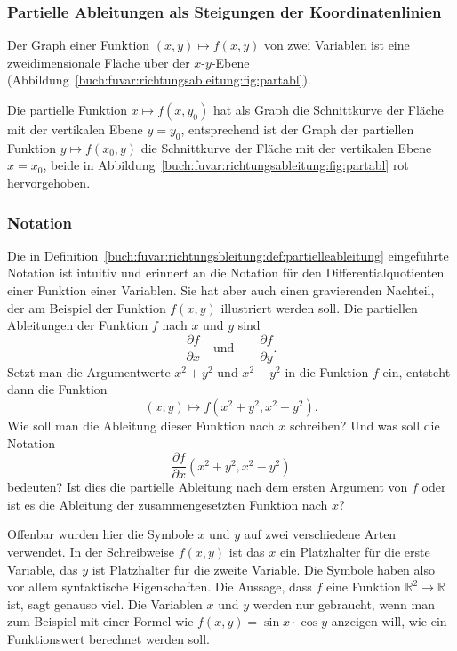 %
%
\subsubsection{Partielle Ableitungen als Steigungen der Koordinatenlinien}
Der Graph einer Funktion $(x,y)\mapsto f(x,y)$ von zwei Variablen ist 
eine zweidimensionale Fläche über der $x$-$y$-Ebene
(Abbildung~\ref{buch:fuvar:richtungsableitung:fig:partabl}).

Die partielle Funktion $x\mapsto f(x,y_0)$ hat als Graph die Schnittkurve
der Fläche mit der vertikalen Ebene $y=y_0$, entsprechend ist der Graph
der partiellen Funktion $y\mapsto f(x_0,y)$ die Schnittkurve der Fläche
mit der vertikalen Ebene $x=x_0$, beide in
Abbildung~\ref{buch:fuvar:richtungsableitung:fig:partabl} rot hervorgehoben.

%
%
\subsubsection{Notation}
Die in Definition~\ref{buch:fuvar:richtungsbleitung:def:partielleableitung}
eingeführte Notation ist intuitiv und erinnert an die Notation für den
Differentialquotienten einer Funktion einer Variablen.
Sie hat aber auch einen gravierenden Nachteil, der am Beispiel
der Funktion $f(x,y)$ illustriert werden soll.
Die partiellen Ableitungen der Funktion $f$ nach $x$ und $y$ sind
\[
\frac{\partial f}{\partial x}
\quad\text{und}\qquad
\frac{\partial f}{\partial y}.
\]
Setzt man die Argumentwerte $x^2+y^2$ und $x^2-y^2$ in die Funktion
$f$ ein, entsteht dann die Funktion
\begin{equation}
(x,y) \mapsto f(x^2+y^2,x^2-y^2).
\label{buch:fuvar:richtungsableitung:eqn:feingesetzt}
\end{equation}
Wie soll man die Ableitung dieser Funktion nach $x$ schreiben?
Und was soll die Notation
\[
\frac{\partial f}{\partial x}(x^2+y^2,x^2-y^2)
\]
bedeuten?
Ist dies die partielle Ableitung nach dem ersten Argument von $f$
oder ist es die Ableitung der zusammengesetzten Funktion nach $x$?

Offenbar wurden hier die Symbole $x$ und $y$ auf zwei verschiedene
Arten verwendet.
In der Schreibweise $f(x,y)$ ist das $x$ ein Platzhalter für die
erste Variable, das $y$ ist Platzhalter für die zweite Variable.
Die Symbole haben also vor allem syntaktische Eigenschaften.
Die Aussage, dass $f$ eine Funktion $\mathbb{R}^2\to\mathbb{R}$
ist, sagt genauso viel.
Die Variablen $x$ und $y$ werden nur gebraucht, wenn man zum
Beispiel mit einer Formel wie $f(x,y)=\sin x\cdot\cos y$ 
anzeigen will, wie ein Funktionswert berechnet werden soll.

